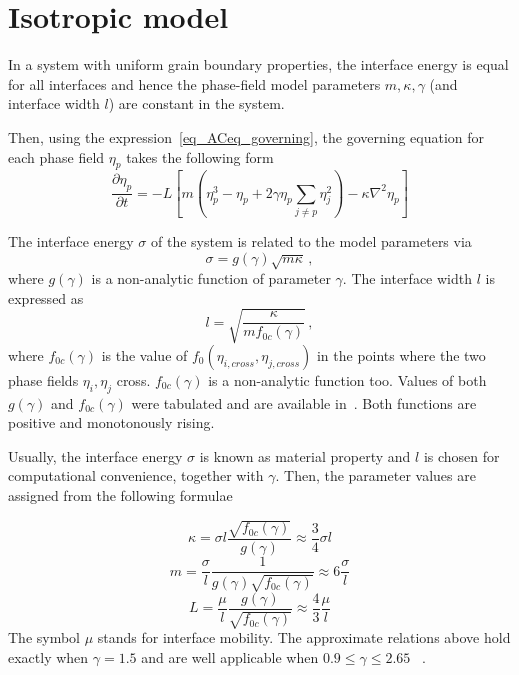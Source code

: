 \section{Isotropic model}
\label{sec_Models}
In a system with uniform grain boundary properties, the interface energy is equal for all interfaces and hence the phase-field model parameters $m,\kappa, \gamma$ (and interface width $l$) are constant in the system.

Then, using the expression~\eqref{eq_ACeq_governing}, the governing equation for each phase field $\eta_p$ takes the following form %
\begin{equation}
	\frac{\partial \eta_p}{\partial t} = -L\left[ m\left( \eta_p^3-\eta_p +  2\gamma\eta_p\sum_{j\neq p}\eta_j^2 \right) - \kappa\nabla^2\eta_p \right] 
\end{equation}

The interface energy $\sigma$ of the system is related to the model parameters via 
\begin{equation}\label{eq_IE}
	\sigma = g(\gamma)\sqrt{m\kappa} \,,
\end{equation}
where $g(\gamma)$ is a non-analytic function of parameter $\gamma$. The interface width $l$ is expressed as
\begin{equation} \label{eq_IW}
	l = \sqrt{\frac{\kappa}{mf_{0c}(\gamma)}} \,,
\end{equation}
where $f_{0c}(\gamma)$ is the value of $f_0(\eta_{i,cross},\eta_{j,cross})$ in the points where the two phase fields $\eta_i,\eta_j$ cross. $f_{0c}(\gamma)$ is a non-analytic function too. Values of both $g(\gamma)$ and $f_{0c}(\gamma)$ were tabulated and are available in~\cite{Ravash2017}. Both functions are positive and monotonously rising.

Usually, the interface energy $\sigma$ is known as material property and $l$ is chosen for computational convenience, together with $\gamma$. Then, the parameter values are assigned from the following formulae

\begin{equation}\label{eq_def_kappa}
	\kappa = \sigma l\frac{\sqrt{f_{0c}(\gamma)}}{g(\gamma)} \approx \frac{3}{4}\sigma l
\end{equation}
\begin{equation} \label{eq_def_m}
	m = \frac{\sigma}{l}\frac{1}{g(\gamma)\sqrt{f_{0c}(\gamma)}} \approx 6 \frac{\sigma}{l}
\end{equation}
\begin{equation}\label{eq_def_L}
	L = \frac{\mu}{l}\frac{g(\gamma)}{\sqrt{f_{0c}(\gamma)}} \approx \frac{4}{3} \frac{\mu}{l}
\end{equation}
The symbol $\mu$ stands for interface mobility. The approximate relations above hold exactly when $\gamma=1.5$ and are well applicable when $0.9 \leq \gamma \leq 2.65$ ~\cite{Moelans2008}. 

